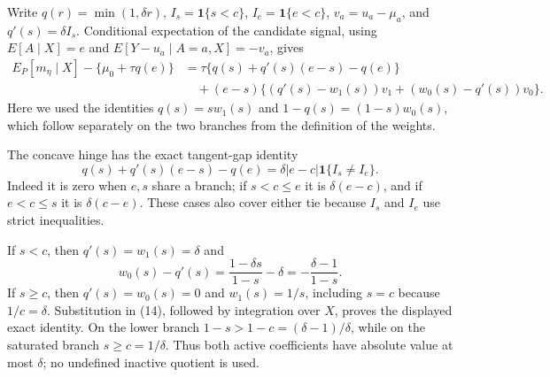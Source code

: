 Write \(q(r)=\min(1,\delta r)\), \(I_s=\mathbf1\{s<c\}\),
\(I_e=\mathbf1\{e<c\}\), \(v_a=u_a-\mu_a\), and \(q'(s)=\delta I_s\).  Conditional expectation of the candidate signal, using
\(E[A\mid X]=e\) and \(E[Y- u_a\mid A=a,X]=-v_a\), gives
\begin{equation}
\begin{aligned}
 E_P[m_\eta\mid X]-\{\mu_0+\tau q(e)\}
 &=\tau\{q(s)+q'(s)(e-s)-q(e)\}\\
 &\quad +(e-s)\{(q'(s)-w_1(s))v_1+(w_0(s)-q'(s))v_0\}.
\end{aligned}                                                                             \tag{14}
\end{equation}
Here we used the identities \(q(s)=s w_1(s)\) and
\(1-q(s)=(1-s)w_0(s)\), which follow separately on the two branches from the definition of the weights.

The concave hinge has the exact tangent-gap identity
\begin{equation}
 q(s)+q'(s)(e-s)-q(e)
 =\delta |e-c|\mathbf1\{I_s\ne I_e\}.                                                    \tag{15}
\end{equation}
Indeed it is zero when \(e,s\) share a branch; if \(s<c\le e\) it is
\(\delta(e-c)\), and if \(e<c\le s\) it is \(\delta(c-e)\).  These cases also cover either tie because \(I_s\) and \(I_e\) use strict inequalities.

If \(s<c\), then \(q'(s)=w_1(s)=\delta\) and
\begin{equation}
 w_0(s)-q'(s)=\frac{1-\delta s}{1-s}-\delta
 =-\frac{\delta-1}{1-s}.
\end{equation}
If \(s\ge c\), then \(q'(s)=w_0(s)=0\) and \(w_1(s)=1/s\), including \(s=c\) because \(1/c=\delta\).  Substitution in (14), followed by integration over \(X\), proves the displayed exact identity.  On the lower branch \(1-s>1-c=(\delta-1)/\delta\), while on the saturated branch \(s\ge c=1/\delta\).  Thus both active coefficients have absolute value at most \(\delta\); no undefined inactive quotient is used.

